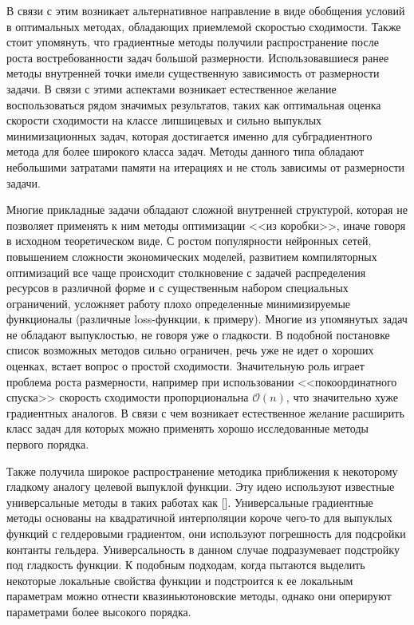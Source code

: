 В связи с этим возникает альтернативное направление в виде обобщения условий в оптимальных методах, обладающих приемлемой скоростью сходимости. Также стоит упомянуть, что градиентные методы получили распространение после роста  востребованности задач большой размерности. Использовавшиеся ранее методы внутренней точки имели существенную зависимость от размерности задачи. В связи с этими аспектами возникает естественное желание воспользоваться рядом значимых результатов, таких как оптимальная оценка скорости сходимости на классе липшицевых и сильно выпуклых минимизационных задач, которая достигается именно для субградиентного метода \cite{Simon_Julien_Bach_2012} для более широкого класса задач. Методы данного типа обладают небольшими затратами памяти на итерациях и не столь зависимы от размерности задачи. 

Многие прикладные задачи обладают сложной внутренней структурой, которая не позволяет применять к ним методы оптимизации <<из коробки>>, иначе говоря в исходном теоретическом виде. С ростом популярности нейронных сетей, повышением сложности экономических моделей, развитием компиляторных оптимизаций все чаще происходит столкновение с задачей распределения ресурсов в различной форме и с существенным набором специальных ограничений, усложняет работу плохо определенные минимизируемые функционалы (различные loss-функции, к примеру). Многие из упомянутых задач не обладают выпуклостью, не говоря уже о гладкости. В подобной постановке список возможных методов сильно ограничен,  речь уже не идет о хороших оценках, встает вопрос о простой сходимости. Значительную роль играет проблема роста размерности, например при использовании <<покоординатного спуска>> скорость сходимости пропорциональна $\mathcal{O} (n)$, что значительно хуже градиентных аналогов. В связи с чем возникает естественное желание расширить класс задач для которых можно применять хорошо исследованные методы первого порядка. 

  Также получила широкое распространение методика приближения к некоторому гладкому аналогу целевой выпуклой функции. Эту идею используют известные универсальные методы в таких работах как []. Универсальные градиентные методы основаны на квадратичной интерполяции короче чего-то для выпуклых функций с гелдеровыми градиентом, они используют погрешность для подсройки контанты гельдера. Универсальность в данном случае подразумевает подстройку под гладкость функции. К подобным подходам, когда пытаются выделить некоторые локальные свойства функции и подстроится к ее локальным параметрам можно отнести квазиньютоновские методы, однако они оперируют параметрами более высокого порядка. 

